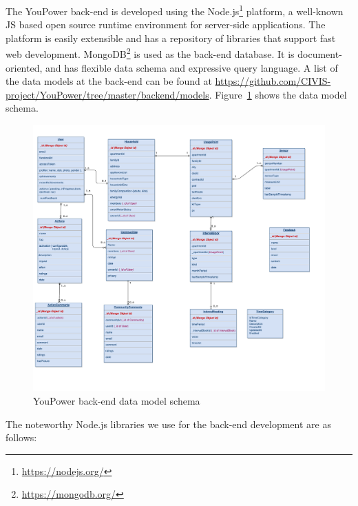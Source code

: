 The YouPower back-end is developed using the Node.js\footnote{\url{https://nodejs.org/}} platform, a well-known JS based open source runtime environment for server-side applications. 
The platform is easily extensible and has a repository of libraries that support fast web development.
MongoDB\footnote{\url{https://mongodb.org/}} is used as the back-end database. It is document-oriented, and has flexible data schema and expressive query language. 
A list of the data models at the back-end can be found at {\footnotesize\url{https://github.com/CIVIS-project/YouPower/tree/master/backend/models}}. 
Figure~\ref{fig:datamodel} shows the data model schema.
%
\begin{figure}
\centering
\includegraphics[height=\linewidth,angle=90]{img/datamodel_larger}
\caption{YouPower back-end data model schema}
\label{fig:datamodel}
\end{figure} 
% 
The noteworthy Node.js libraries we use for the back-end development are as follows:
